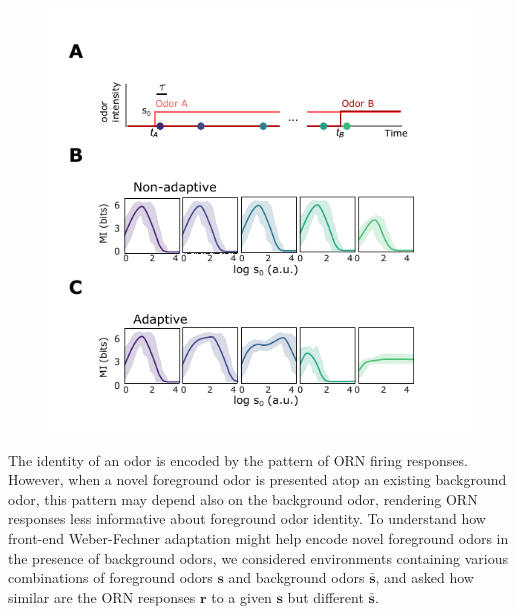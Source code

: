 \documentclass[9pt,lineno]{elife}
\begin{document}
\begin{figure}
\begin{fullwidth}
{		}
		{\includegraphics[width=0.85\linewidth]{figure2_supp2}}
		\label{figsupp:SI_MI}
	\end{fullwidth}
\end{figure}

{\color{blue} The identity of an odor is encoded by the pattern of ORN firing responses. However, when a novel foreground odor is presented atop an existing background odor, this pattern may depend also on the background odor, rendering ORN responses less informative about foreground odor identity. To understand how front-end Weber-Fechner adaptation might help encode novel foreground odors in the presence of background odors, we considered environments containing various combinations of foreground odors $\mathbf{s}$ and background odors $\bar{\mathbf{s}}$, and asked how similar are the ORN responses $\mathbf r$ to a given $\mathbf{s}$ but different $\bar{\mathbf{s}}$. }
\end{document}
